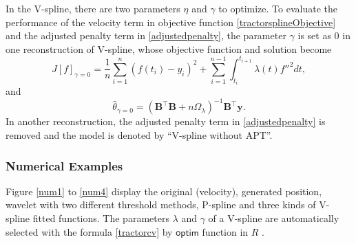 In the V-spline, there are two parameters $\eta$ and $\gamma$ to optimize. To evaluate the performance of the velocity term in objective function \eqref{tractorsplineObjective} and the adjusted penalty term in \eqref{adjustedpenalty}, the parameter $\gamma$ is set as 0 in one reconstruction of V-spline, whose objective function and solution become
\begin{equation}\label{ofgamma0}
J[f]_{\gamma=0}= \frac{1}{n} \sum_{i=1}^{n} \left(f(t_i)-y_i\right)^2 +\sum_{i=1}^{n-1} \int_{t_i}^{t_{i+1}}\lambda(t) f''^2 dt,
\end{equation}
and
\begin{equation}\label{thetahat0}
\hat{\theta}_{\gamma=0}=\left(\mathbf{B}^\top\mathbf{B}+n\Omega_{\lambda}\right)^{-1}\mathbf{B}^\top\mathbf{y}.
\end{equation}
In another reconstruction, the adjusted penalty term in \eqref{adjustedpenalty} is removed and the model is denoted by ``V-spline without APT''. 




\subsubsection{Numerical Examples}


Figure \ref{num1} to \ref{num4} display the original (velocity), generated position, wavelet with two different threshold methods, P-spline and three kinds of V-spline fitted functions. The parameters $\lambda$ and $\gamma$ of a V-spline are automatically selected with the formula \eqref{tractorcv} by $\textsf{optim}$ function in $R$ \citep{nelder1965simplex}.


